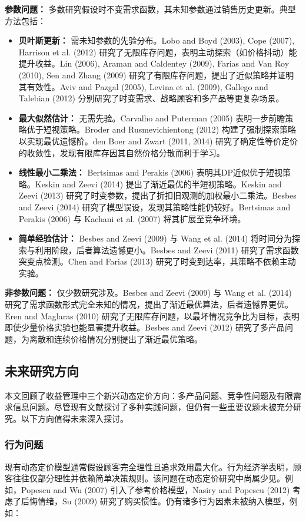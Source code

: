 \textbf{参数问题：}
多数研究假设时不变需求函数，其未知参数通过销售历史更新。典型方法包括：
\begin{itemize}
	\item \textbf{贝叶斯更新：} 需未知参数的先验分布。Lobo and Boyd (2003), Cope (2007), Harrison et al. (2012) 研究了无限库存问题，表明主动探索（如价格抖动）能提升收益。Lin (2006), Araman and Caldentey (2009), Farias and Van Roy (2010), Sen and Zhang (2009) 研究了有限库存问题，提出了近似策略并证明其有效性。Aviv and Pazgal (2005), Levina et al. (2009), Gallego and Talebian (2012) 分别研究了时变需求、战略顾客和多产品等更复杂场景。
	\item \textbf{最大似然估计：} 无需先验。Carvalho and Puterman (2005) 表明一步前瞻策略优于短视策略。Broder and Rusmevichientong (2012) 构建了强制探索策略以实现最优遗憾阶。den Boer and Zwart (2011, 2014) 研究了确定性等价定价的收敛性，发现有限库存因其自然价格分散而利于学习。
	\item \textbf{线性最小二乘法：} Bertsimas and Perakis (2006) 表明其DP近似优于短视策略。Keskin and Zeevi (2014) 提出了渐近最优的半短视策略。Keskin and Zeevi (2013) 研究了时变参数，提出了折扣旧观测的加权最小二乘法。Besbes and Zeevi (2014) 研究了模型误设，发现其策略性能仍较好。Bertsimas and Perakis (2006) 与 Kachani et al. (2007) 将其扩展至竞争环境。
	\item \textbf{简单经验估计：} Besbes and Zeevi (2009) 与 Wang et al. (2014) 将时间分为探索与利用阶段，后者算法遗憾更小。Besbes and Zeevi (2011) 研究了需求函数突变点检测。Chen and Farias (2013) 研究了时变到达率，其策略不依赖主动实验。
\end{itemize}

\textbf{非参数问题：}
仅少数研究涉及。Besbes and Zeevi (2009) 与 Wang et al. (2014) 研究了需求函数形式完全未知的情况，提出了渐近最优算法，后者遗憾界更优。Eren and Maglaras (2010) 研究了无限库存问题，以最坏情况竞争比为目标，表明即使少量价格实验也能显著提升收益。Besbes and Zeevi (2012) 研究了多产品问题，为离散和连续价格情况分别提出了渐近最优策略。


\subsection{未来研究方向}\label{future-research-directions}

本文回顾了收益管理中三个新兴动态定价方向：多产品问题、竞争性问题及有限需求信息问题。尽管现有文献探讨了多种实践问题，但仍有一些重要议题未被充分研究。以下方向值得未来深入探讨。

\subsubsection{行为问题}
现有动态定价模型通常假设顾客完全理性且追求效用最大化。行为经济学表明，顾客往往仅部分理性并依赖简单决策规则。该问题在动态定价研究中尚属少见。例如，Popescu and Wu (2007) 引入了参考价格模型，Nasiry and Popescu (2012) 考虑了后悔情绪，Su (2009) 研究了购买惯性。仍有诸多行为因素未被纳入模型，例如：

